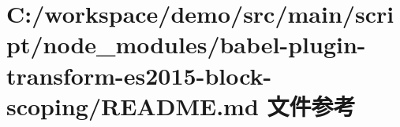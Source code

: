\hypertarget{node__modules_2babel-plugin-transform-es2015-block-scoping_2_r_e_a_d_m_e_8md}{}\section{C\+:/workspace/demo/src/main/script/node\+\_\+modules/babel-\/plugin-\/transform-\/es2015-\/block-\/scoping/\+R\+E\+A\+D\+ME.md 文件参考}
\label{node__modules_2babel-plugin-transform-es2015-block-scoping_2_r_e_a_d_m_e_8md}
